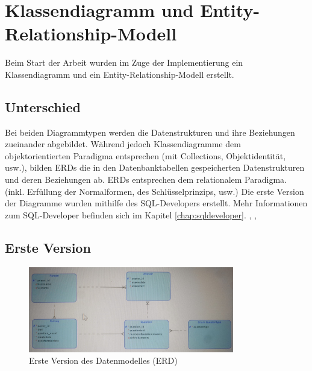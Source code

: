\section{Klassendiagramm und Entity-Relationship-Modell}
Beim Start der Arbeit wurden im Zuge der Implementierung 
ein Klassendiagramm und ein Entity-Relationship-Modell erstellt.

\subsection{Unterschied}
Bei beiden Diagrammtypen werden die Datenstrukturen und ihre Beziehungen zueinander abgebildet. 
Während jedoch Klassendiagramme dem objektorientierten Paradigma entsprechen (mit Collections, Objektidentität, usw.), 
bilden ERDs die in den Datenbanktabellen gespeicherten Datenstrukturen und deren Beziehungen ab. ERDs entsprechen dem 
relationalem Paradigma. (inkl. Erfüllung der Normalformen, des Schlüsselprinzips, usw.)
\newline
\newline
Die erste Version der Diagramme wurden mithilfe des SQL-Developers erstellt. Mehr Informationen zum SQL-Developer 
befinden sich im Kapitel \ref{chap:sqldeveloper}. \cite{noauthor_was_nodate-2}, \cite{noauthor_klassendiagramm_2022}, \cite{noauthor_klassendiagramm_nodate}

\subsection{Erste Version}
\begin{figure}[H]
    \includegraphics[width=0.8\textwidth]{pics/Datamodel_Version1.jpeg}
    \centering
    \caption{Erste Version des Datenmodelles (ERD)}
    \label{fig:cld1}
\end{figure}

